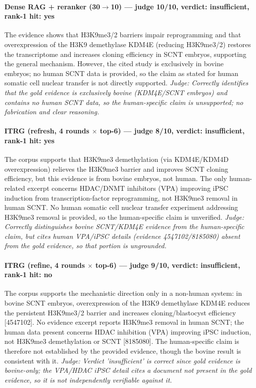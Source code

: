 \documentclass[sigconf, review, anonymous]{acmart}
\begin{document}
\paragraph{Dense RAG + reranker (30$\to$10) --- judge 10/10, verdict: insufficient, rank-1 hit: yes}
\noindent The evidence shows that H3K9me3/2 barriers impair reprogramming and that overexpression of the H3K9 demethylase KDM4E (reducing H3K9me3/2) restores the transcriptome and increases cloning efficiency in SCNT embryos, supporting the general mechanism. However, the cited study is exclusively in bovine embryos; no human SCNT data is provided, so the claim as stated for human somatic cell nuclear transfer is not directly supported.
\noindent\small\textit{Judge: Correctly identifies that the gold evidence is exclusively bovine (KDM4E/SCNT embryos) and contains no human SCNT data, so the human-specific claim is unsupported; no fabrication and clear reasoning.}
\paragraph{ITRG (refresh, 4 rounds $\times$ top-6) --- judge 8/10, verdict: insufficient, rank-1 hit: yes}
\noindent The corpus supports that H3K9me3 demethylation (via KDM4E/KDM4D overexpression) relieves the H3K9me3 barrier and improves SCNT cloning efficiency, but this evidence is from bovine embryos, not human. The only human-related excerpt concerns HDAC/DNMT inhibitors (VPA) improving iPSC induction from transcription-factor reprogramming, not H3K9me3 removal in human SCNT. No human somatic cell nuclear transfer experiment addressing H3K9me3 removal is provided, so the human-specific claim is unverified.
\noindent\small\textit{Judge: Correctly distinguishes bovine SCNT/KDM4E evidence from the human-specific claim, but cites human VPA/iPSC details (evidence 4547102/8185080) absent from the gold evidence, so that portion is ungrounded.}
\paragraph{ITRG (refine, 4 rounds $\times$ top-6) --- judge 9/10, verdict: insufficient, rank-1 hit: no}
\noindent The corpus supports the mechanistic direction only in a non-human system: in bovine SCNT embryos, overexpression of the H3K9 demethylase KDM4E reduces the persistent H3K9me3/2 barrier and increases cloning/blastocyst efficiency [4547102]. No evidence excerpt reports H3K9me3 removal in human SCNT; the human data present concerns HDAC inhibition (VPA) improving iPSC induction, not H3K9me3 demethylation or SCNT [8185080]. The human-specific claim is therefore not established by the provided evidence, though the bovine result is consistent with it.
\noindent\small\textit{Judge: Verdict 'insufficient' is correct since gold evidence is bovine-only; the VPA/HDAC iPSC detail cites a document not present in the gold evidence, so it is not independently verifiable against it.}
\end{document}
